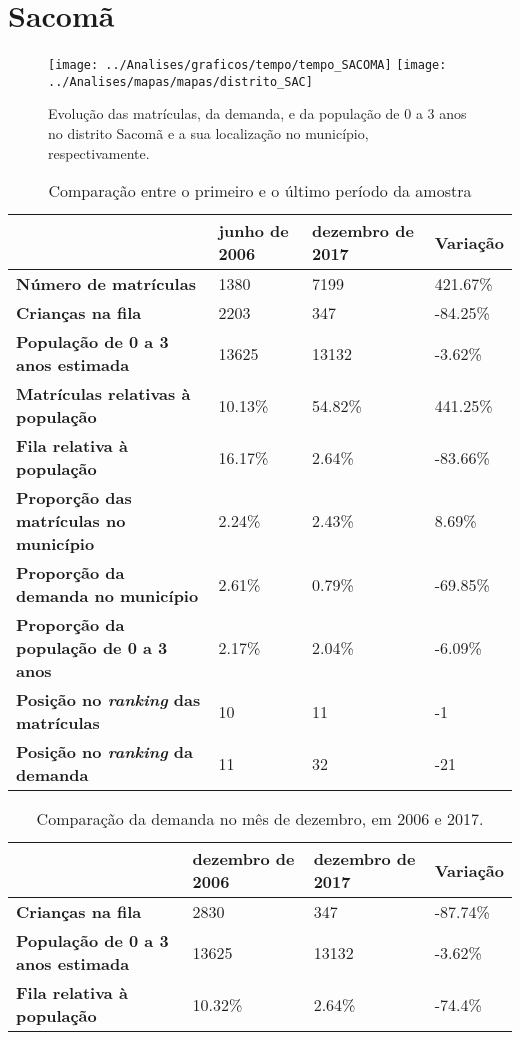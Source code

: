 \section{Sacomã}
\begin{figure}[H]
\centering
\texttt{[image: ../Analises/graficos/tempo/tempo\_SACOMA]}
\texttt{[image: ../Analises/mapas/mapas/distrito\_SAC]}
\caption{Evolução das matrículas, da demanda, e da população de 0 a 3 anos no distrito Sacomã e a sua localização no município, respectivamente.}
\end{figure}
\begin{table}[H]
\begin{tabular}{l|l|l|l}
\textbf{}                                      & \textbf{junho de 2006}       & \textbf{dezembro de 2017}    & \textbf{Variação} \\ \hline
\textbf{Número de matrículas}                  & 1380 & 7199 & 421.67\% \\ \hline
\textbf{Crianças na fila}                      & 2203 & 347 & -84.25\% \\ \hline
\textbf{População de 0 a 3 anos estimada}      & 13625 & 13132 & -3.62\% \\ \hline
\textbf{Matrículas relativas à população}      & 10.13\% & 54.82\% & 441.25\% \\ \hline
\textbf{Fila relativa à população}             & 16.17\% & 2.64\% & -83.66\% \\ \hline
\textbf{Proporção das matrículas no município} & 2.24\% & 2.43\% & 8.69\% \\ \hline
\textbf{Proporção da demanda no município}     & 2.61\% & 0.79\% & -69.85\% \\ \hline
\textbf{Proporção da população de 0 a 3 anos}  & 2.17\% & 2.04\% & -6.09\% \\ \hline
\textbf{Posição no \textit{ranking} das matrículas}     & 10 & 11 & -1 \\ \hline
\textbf{Posição no \textit{ranking} da demanda}         & 11 & 32 & -21 \\ 
\end{tabular}
\caption{Comparação entre o primeiro e o último período da amostra}
\end{table}
\begin{table}[H]
\begin{tabular}{l|l|l|l}
\textbf{}                                 & \textbf{dezembro de 2006} & \textbf{dezembro de 2017} & \textbf{Variação} \\ \hline
\textbf{Crianças na fila}                      & 2830 & 347 & -87.74\% \\ \hline
\textbf{População de 0 a 3 anos estimada}      & 13625 & 13132 & -3.62\% \\ \hline
\textbf{Fila relativa à população}             & 10.32\% & 2.64\% & -74.4\% \\
\end{tabular}
\caption{Comparação da demanda no mês de dezembro, em 2006 e 2017.}
\end{table}
